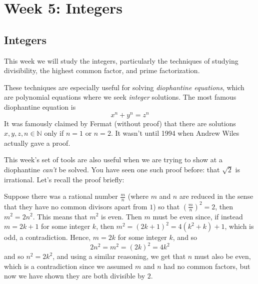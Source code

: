\documentclass[11pt,dvipsnames]{book}
\numberwithin{figure}{section} %
\numberwithin{table}{section} %
\begin{document}
%
%



\part{Week 5: Integers}

\chapter{Integers}%
\label{integers}



This week we will study the integers, particularly the techniques of studying divisibility, the highest common factor, and prime factorization.

These techniques are especially useful for solving {\it diophantine equations}, which are polynomial equations where we seek {\it integer} solutions. The most famous diophantine equation is
\[
x^{n}+y^{n}=z^{n}\]
It was famously claimed by Fermat (without proof) that there are solutions  $x,y,z,n\in\mathbb{N}$ only if $n=1$ or $n=2$. It wasn't until 1994 when Andrew Wiles actually gave a proof.

This week's set of tools are also useful when we are trying to show at a diophantine {\it can't} be solved. You have seen one such proof before: that $\sqrt{2}$ is irrational. Let's recall the proof briefly:

Suppose there was a rational number $\frac{m}{n}$ (where $m$ and $n$ are reduced in the sense that they have no common divisors apart from $1$) so that $\left(\frac{m}{n}\right)^2=2$, then $m^2=2n^2$. This means that $m^2$ is even. Then $m$ must be even since, if instead $m=2k+1$ for some integer $k$, then $m^2=(2k+1)^2=4(k^2+k)+1$, which is odd, a contradiction. Hence, $m=2k$ for some integer $k$, and so
\[
2n^2=m^2=(2k)^2=4k^2\]
and so $n^2=2k^2$, and using a similar reasoning, we get that $n$ must also be even, which is a contradiction since we assumed $m$ and $n$ had no common factors, but now we have shown they are both divisible by $2$.
\end{document}

